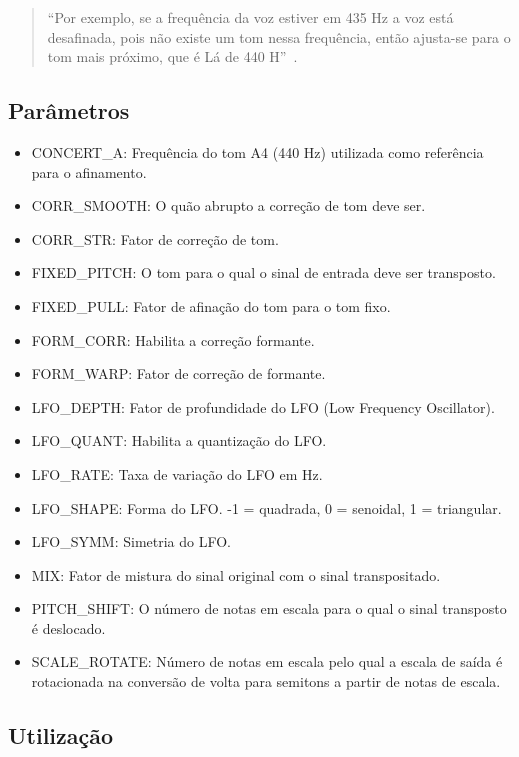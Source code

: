 \documentclass{sbrt}
\begin{document}
\begin{quote}
  ``Por exemplo, se a frequência da voz estiver em 435 Hz a voz está desafinada, pois não existe um tom nessa frequência, então ajusta-se para o tom mais próximo, que é Lá de 440 H''~\cite{deimplementaccao}.
\end{quote}

\subsection{Parâmetros}

\begin{itemize}
  \item CONCERT\_A: Frequência do tom A4 (440 Hz) utilizada como referência para o afinamento.
  \item CORR\_SMOOTH: O quão abrupto a correção de tom deve ser.
  \item CORR\_STR: Fator de correção de tom.
  \item FIXED\_PITCH: O tom para o qual o sinal de entrada deve ser transposto.
  \item FIXED\_PULL: Fator de afinação do tom para o tom fixo.
  \item FORM\_CORR: Habilita a correção formante.
  \item FORM\_WARP: Fator de correção de formante.
  \item LFO\_DEPTH: Fator de profundidade do LFO (Low Frequency Oscillator).
  \item LFO\_QUANT: Habilita a quantização do LFO.
  \item LFO\_RATE: Taxa de variação do LFO em Hz.
  \item LFO\_SHAPE: Forma do LFO. -1 = quadrada, 0 = senoidal, 1 = triangular.
  \item LFO\_SYMM: Simetria do LFO.
  \item MIX: Fator de mistura do sinal original com o sinal transpositado.
  \item PITCH\_SHIFT: O número de notas em escala para o qual o sinal transposto é deslocado.
  \item SCALE\_ROTATE: Número de notas em escala pelo qual a escala de saída é rotacionada na conversão de volta para semitons a partir de notas de escala.
\end{itemize}

\subsection{Utilização}
\end{document}

